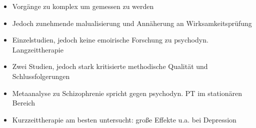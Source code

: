 \documentclass[11pt, paper=a4, twocolumn]{scrartcl}
\begin{document}
\begin{itemize}
\begin{itemize}
					\item Vorgänge zu komplex um gemessen zu werden
					\item Jedoch zunehmende malualisierung und Annäherung an Wirksamkeitsprüfung
					\item Einzelstudien, jedoch keine emoirische Forschung zu psychodyn. Langzeittherapie
					\item Zwei Studien, jedoch stark kritisierte methodische Qualität und Schlussfolgerungen
					\item Metaanalyse zu Schizophrenie spricht gegen psychodyn. PT im stationären Bereich
					\item Kurzzeittherapie am besten untersucht: große Effekte u.a. bei Depression
				\end{itemize}
		\end{itemize}
\end{document}
